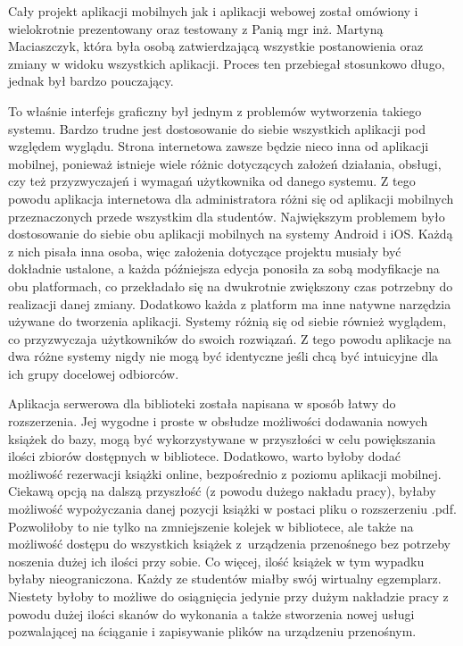 \documentclass[twoside]{projektInzynierskiMS}
\begin{document}
Cały projekt aplikacji mobilnych jak i aplikacji webowej został omówiony i wielokrotnie prezentowany oraz testowany z Panią mgr inż. Martyną Maciaszczyk, która była osobą zatwierdzającą wszystkie postanowienia oraz zmiany w widoku wszystkich aplikacji. Proces ten przebiegał stosunkowo długo, jednak był bardzo pouczający.

To właśnie interfejs graficzny był jednym z problemów wytworzenia takiego systemu. Bardzo trudne jest dostosowanie do siebie wszystkich aplikacji pod względem wyglądu. Strona internetowa zawsze będzie nieco inna od aplikacji mobilnej, ponieważ istnieje wiele różnic dotyczących założeń działania, obsługi, czy też przyzwyczajeń i wymagań użytkownika od danego systemu. Z tego powodu aplikacja internetowa dla administratora różni się od aplikacji mobilnych przeznaczonych przede wszystkim dla studentów. Największym problemem było dostosowanie do siebie obu aplikacji mobilnych na systemy Android i iOS. Każdą z nich pisała inna osoba, więc założenia dotyczące projektu musiały być dokładnie ustalone, a każda późniejsza edycja ponosiła za sobą modyfikacje na obu platformach, co przekładało się na dwukrotnie zwiększony czas potrzebny do realizacji danej zmiany. Dodatkowo każda z platform ma inne natywne narzędzia używane do tworzenia aplikacji. Systemy różnią się od siebie również wyglądem, co przyzwyczaja użytkowników do swoich rozwiązań. Z tego powodu aplikacje na dwa różne systemy nigdy nie mogą być identyczne jeśli chcą być intuicyjne dla ich grupy docelowej odbiorców.

Aplikacja serwerowa dla biblioteki została napisana w sposób łatwy do rozszerzenia. Jej wygodne i proste w obsłudze możliwości dodawania nowych książek do bazy, mogą być wykorzystywane w przyszłości w celu powiększania ilości zbiorów dostępnych w bibliotece. Dodatkowo, warto byłoby dodać możliwość rezerwacji książki online, bezpośrednio z poziomu aplikacji mobilnej. Ciekawą opcją na dalszą przyszłość (z powodu dużego nakładu pracy), byłaby możliwość wypożyczania danej pozycji książki w postaci pliku o rozszerzeniu .pdf. Pozwoliłoby to nie tylko na zmniejszenie kolejek w bibliotece, ale także na możliwość dostępu do wszystkich książek z~urządzenia przenośnego bez potrzeby noszenia dużej ich ilości przy sobie. Co więcej, ilość książek w tym wypadku byłaby nieograniczona. Każdy ze studentów miałby swój wirtualny egzemplarz. Niestety byłoby to możliwe do osiągnięcia jedynie przy dużym nakładzie pracy z powodu dużej ilości skanów do wykonania a także stworzenia nowej usługi pozwalającej na ściąganie i zapisywanie plików na urządzeniu przenośnym.
\end{document}
